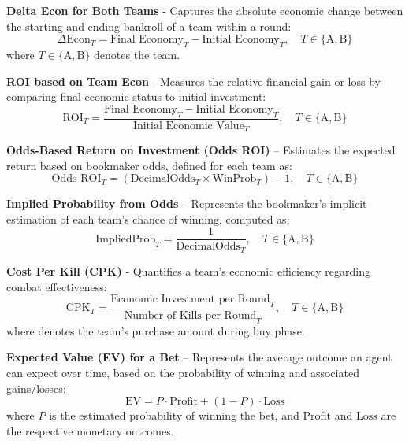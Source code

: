 \documentclass[sigconf]{acmart}
\begin{document}
\bigskip

\textbf{Delta Econ for Both Teams} - Captures the absolute economic change between the starting and ending bankroll of a team within a round:
\begin{equation}
  \Delta\text{Econ}_{T} = \text{Final Economy}_{T} - \text{Initial Economy}_{T}, \quad T \in \{\text{A}, \text{B}\}
\end{equation}\noindent where \( T \in \{\text{A}, \text{B}\} \) denotes the team.

\bigskip

\textbf{ROI based on Team Econ} - Measures the relative financial gain or loss by comparing final economic status to initial investment:
\begin{equation}
  \text{ROI}_{T} = \frac{\text{Final Economy}_{T} - \text{Initial Economy}_{T}}{\text{Initial Economic Value}_{T}}, \quad T \in \{\text{A}, \text{B}\}
\end{equation}

\bigskip

\textbf{Odds-Based Return on Investment (Odds ROI)} – Estimates the expected return based on bookmaker odds, defined for each team as:
\begin{equation}
  \text{Odds ROI}_T = (\text{DecimalOdds}_T \times \text{WinProb}_T) - 1, \quad T \in \{\text{A}, \text{B}\}
\end{equation}

\bigskip

\textbf{Implied Probability from Odds} – Represents the bookmaker's implicit estimation of each team's chance of winning, computed as:
\begin{equation}
  \text{ImpliedProb}_T = \frac{1}{\text{DecimalOdds}_T}, \quad T \in \{\text{A}, \text{B}\}
\end{equation}

\bigskip

\textbf{Cost Per Kill (CPK)} - Quantifies a team's economic efficiency regarding combat effectiveness:
\begin{equation}
  \text{CPK}_{T} = \frac{\text{Economic Investment per Round}_{T}}{\text{Number of Kills per Round}_{T}}, \quad T \in \{\text{A}, \text{B}\}
\end{equation}
\noindent where  denotes the team's purchase amount during buy phase.

\bigskip

\textbf{Expected Value (EV) for a Bet} – Represents the average outcome an agent can expect over time, based on the probability of winning and associated gains/losses:
\begin{equation}
  \text{EV} = P \cdot \text{Profit} + (1 - P) \cdot \text{Loss}
\end{equation}
\noindent where \( P \) is the estimated probability of winning the bet, and \(\text{Profit}\) and \(\text{Loss}\) are the respective monetary outcomes.
\end{document}
